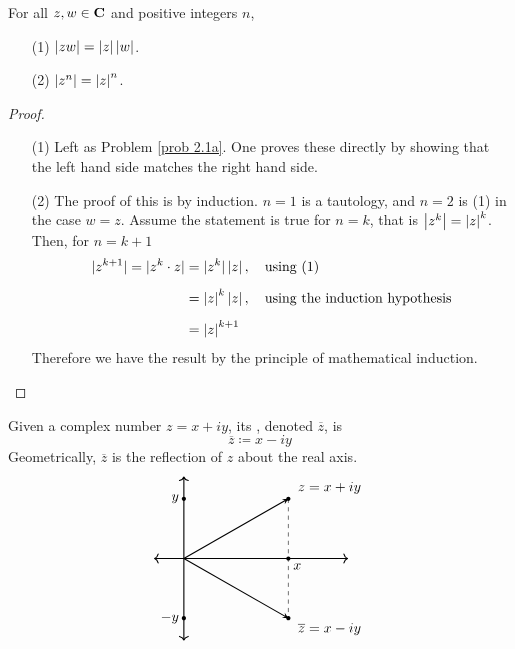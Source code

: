 \begin{proposition}\label{normmult}
For all $z,w \in \mathbf C$ and positive integers $n$, 
\begin{multicols}{2}
\begin{itemize}
\item[(1)] $\left\lvert zw\right\rvert = \left\lvert z\right\rvert\left\lvert w\right\rvert$.
\item[(2)] $\left\lvert z^n\right\rvert = \left\lvert z\right\rvert^n$.
\end{itemize}
\end{multicols}
\end{proposition}
\begin{proof}\hfill
\begin{itemize}
\item[(1)] Left as Problem \ref{prob 2.1a}. One proves these directly by showing that the left hand side matches the right hand side.
\item[(2)] The proof of this is by induction. $n = 1$ is a tautology, and $n = 2$ is (1) in the case $w = z$. Assume the statement is true for $n = k$, that is $\left\lvert z^k\right\rvert = \left\lvert z\right\rvert^k$. Then, for $n = k + 1$
\begin{align*}
|z^{k+1}| = |z^k\cdot z| &= |z^k|\left\lvert z\right\rvert,\quad \text{using (1)}\\[0.5em]
&= \left\lvert z\right\rvert^k\left\lvert z\right\rvert,\quad \text{using the induction hypothesis}\\[0.5em]
&= \left\lvert z\right\rvert^{k+1}
\end{align*}
Therefore we have the result by the principle of mathematical induction.
\end{itemize}
\vspace*{-\baselineskip}
\end{proof}

\medskip

\begin{definition}
Given a complex number $z = x + iy$, its , denoted $\overline{z}$, is
\[\overline{z} \coloneqq x - iy\]
Geometrically, $\overline{z}$ is the reflection of $z$ about the real axis. 
\[\begin{tikzpicture}[scale=0.75]
    \draw[<->,thick] (-1,0)--(5.5,0);
	\draw[<->,thick] (0,-2.75)--(0,2.75);
    \fill (3.5,2) circle (2pt) node[above right]{\ $z = x+iy$};
    \draw[->,>=stealth,thick] (0,0) -- (3.5,2);
    \fill (3.5,-2) circle (2pt) node[below right]{\ $\overline{z} = x-iy$};
    \draw[->,>=stealth,thick] (0,0) -- (3.5,-2);
    \draw[-,dashed] (3.5,2) -- (3.5,-2);
    \fill (3.5,0) circle (2pt) node[below right]{$x$};
    \fill (0,2) circle (2pt) node[left]{$y$};
    \fill (0,-2) circle (2pt) node[left]{$-y$};
  \end{tikzpicture}\]
\end{definition}

